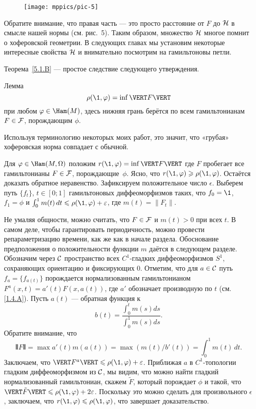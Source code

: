 \begin{figure}[ht!]
\vskip0mm
\centering
\texttt{[image: mppics/pic-5]}
\caption{}\label{pic-5}
\vskip0mm
\end{figure}

Обратите внимание, что правая часть — это просто расстояние от $F$ до $\mathcal{H}$ в смысле нашей нормы (см. рис.~5).
Таким образом, множество $\mathcal{H}$ многое помнит о хоферовской геометрии.
В следующих главах мы установим некоторые интересные свойства $\mathcal{H}$ и внимательно посмотрим на гамильтоновы петли.

Теорема~\ref{5.1.B} — простое следствие следующего утверждения.

\begin{thm}{Лемма}\label{5.1.C}
\[\rho (\1, \phi) = \inf \VERT F \VERT\]
при любом $\phi \in \Ham (M)$, здесь нижняя грань берётся по всем гамильтонианам $F\in\mathcal{F}$, порождающим $\phi$.
\end{thm}

Используя терминологию некоторых моих работ, это значит, что «грубая» хоферовская норма совпадает с обычной.

Для $\phi \in \Ham (M, \Omega)$ положим $r (\1, \phi) \z= \inf \VERT F
\VERT$ где $F$ пробегает все гамильтонианы $F \in \mathcal{F}$,
порождающие~$\phi$. 
Ясно, что $r (\1, \phi) \ge \rho (\1, \phi)$.
Остаётся доказать обратное неравенство. 
Зафиксируем положительное число $\epsilon$.
Выберем путь $\{f_t\}$, $t \in [0; 1]$ гамильтоновых диффеоморфизмов
таких, что $f_0 = \1$, $f_1 = \phi$ и  $\int_0^1 m (t)\,dt \le \rho
(\1, \phi) + \epsilon$, где $m (t) = \| F_t \|$.

Не умаляя общности, можно считать, что $F \in \mathcal{F}$ и $m (t)> 0$ при всех $t$.
В самом деле, чтобы гарантировать периодичность, можно провести
репараметризацию времени, как же как в начале раздела. 
Обоснование
предположения о положительности функции $m$
даётся в следующем разделе.
Обозначим через $\mathcal{C}$ пространство всех $C^1$-гладких диффеоморфизмов
$S^1$, сохраняющих ориентацию и фиксирующих $0$. 
Отметим, что для $a \in \mathcal{C}$ путь $f_a = \{f_{a(t)}\}$ порождается
нормализованным гамильтонианом $F^a (x, t) = a' (t) F (x, a(t))$, где
$a'$ обозначает производную по $t$ (см. \ref{1.4.A}). 
Пусть $a(t)$ --- обратная функция к 
\[b(t)
=
\frac{\int_0^t m(s)ds}{\int_0^1 m(s)ds}.\]
Обратите внимание, что 
\[\VERT F \VERT = \max a' (t) m (a (t)) = \max (m (t) / b'(t)) = \int_0^1m (t)\,dt.\]
Заключаем, что $\VERT F^a \VERT \le \rho (\1, \phi) + \epsilon$.
Приближая $a$ в $C^1$-топологии гладким диффеоморфизмом из $\mathcal{C}$, мы видим, что можно найти гладкий нормализованный гамильтониан, скажем $\tilde F$, который порождает $\phi$ и такой, что $\VERT \tilde F \VERT \le \rho (\1, \phi) + 2\epsilon$.
Поскольку это можно сделать для произвольного $\epsilon$, заключаем, что $r (\1, \phi) \le \rho (\1, \phi)$, что завершает доказательство.
\qeds

